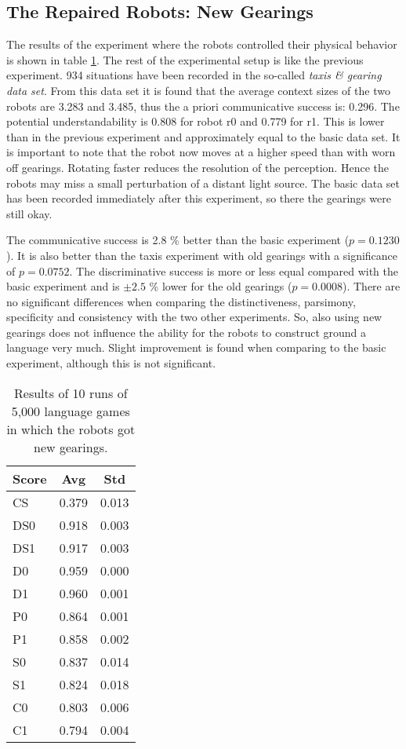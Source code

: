 \subsection{The Repaired Robots: New Gearings}

The results of the experiment where the robots controlled their physical behavior is shown in table \ref{t:int:gearing}. The rest of the experimental setup is like the previous experiment. 934 situations have been recorded in the so-called {\em taxis \& gearing data set}. From this data set it is found that the average context sizes of the two robots are 3.283 and 3.485, thus the a priori communicative success is: 0.296. The potential understandability is 0.808 for robot r0 and 0.779 for r1. This is lower than in the previous experiment and approximately equal to the basic data set. It is important to note that the robot now moves at a higher speed than with worn off gearings. Rotating faster reduces the resolution of the perception. Hence the robots may miss a small perturbation of a distant light source. The basic data set has been recorded immediately after this experiment, so there the gearings were still okay.

The communicative success is 2.8 \%  better than the basic experiment ($p=0.1230$). It is also better than the taxis experiment with old gearings with a significance of $p=0.0752$. The discriminative success is more or less equal compared with the basic experiment and is $\pm 2.5$ \% lower for the old gearings ($p=0.0008$). There are no significant differences when comparing the distinctiveness, parsimony, specificity and consistency with the two other experiments. So, also using new gearings does not influence the ability for the robots to construct ground a language very much. Slight improvement is found when comparing to the basic experiment, although this is not significant.

\begin{table}
\centering
\begin{tabular}{||l|c|c||}
\hline\hline
Score & Avg & Std\\\hline
CS & 0.379 & 0.013\\\hline
DS0 & 0.918 & 0.003\\\hline
DS1 & 0.917 & 0.003\\\hline
D0 & 0.959 & 0.000\\\hline
D1 & 0.960 & 0.001\\\hline
P0 & 0.864 & 0.001\\\hline
P1 & 0.858 & 0.002\\\hline
S0 & 0.837 & 0.014\\\hline
S1 & 0.824 & 0.018\\\hline
C0 & 0.803 & 0.006\\\hline
C1 & 0.794 & 0.004\\\hline
\hline
\end{tabular}
\caption{Results of 10 runs of 5,000 language games in which the robots got new gearings.}
\label{t:int:gearing}
\end{table}

